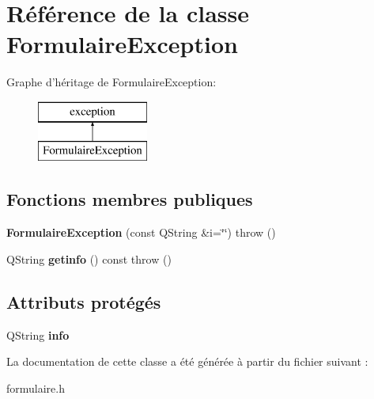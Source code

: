 \hypertarget{class_formulaire_exception}{\section{Référence de la classe Formulaire\+Exception}
\label{class_formulaire_exception}
}
Graphe d'héritage de Formulaire\+Exception\+:\begin{figure}[H]
\begin{center}
\leavevmode
\includegraphics[height=2.000000cm]{class_formulaire_exception}
\end{center}
\end{figure}
\subsection*{Fonctions membres publiques}
\begin{DoxyCompactItemize}
\item 
\hypertarget{class_formulaire_exception_a4481db2c2d3fd6efe8a155133f19c75e}{{\bfseries Formulaire\+Exception} (const Q\+String \&i=\char`\"{}\char`\"{})  throw ()}\label{class_formulaire_exception_a4481db2c2d3fd6efe8a155133f19c75e}

\item 
\hypertarget{class_formulaire_exception_a067f6b72ade9697de1554549de535631}{Q\+String {\bfseries getinfo} () const   throw ()}\label{class_formulaire_exception_a067f6b72ade9697de1554549de535631}

\end{DoxyCompactItemize}
\subsection*{Attributs protégés}
\begin{DoxyCompactItemize}
\item 
\hypertarget{class_formulaire_exception_aebcd242ecf3368163947e8ba41c1f997}{Q\+String {\bfseries info}}\label{class_formulaire_exception_aebcd242ecf3368163947e8ba41c1f997}

\end{DoxyCompactItemize}


La documentation de cette classe a été générée à partir du fichier suivant \+:\begin{DoxyCompactItemize}
\item 
formulaire.\+h\end{DoxyCompactItemize}
